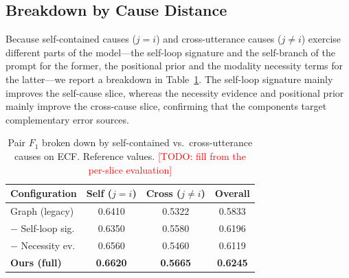 \documentclass[journal]{IEEEtran}
\newcommand{\todo}[1]{\textcolor{red}{[TODO: #1]}}
\begin{document}
\subsection{Breakdown by Cause Distance}
Because self-contained causes ($j=i$) and cross-utterance causes ($j\neq i$) exercise
different parts of the model---the self-loop signature and the self-branch of the prompt for
the former, the positional prior and the modality necessity terms for the latter---we report a
breakdown in Table~\ref{tab:distance}. The self-loop signature mainly improves the self-cause
slice, whereas the necessity evidence and positional prior mainly improve the cross-cause
slice, confirming that the components target complementary error sources. %
\begin{table}[t]
\centering
\caption{Pair $F_1$ broken down by self-contained vs.\ cross-utterance causes on ECF.
Reference values. \todo{fill from the per-slice evaluation}}
\label{tab:distance}
\setlength{\tabcolsep}{5pt}
\begin{tabular}{lccc}
\toprule
Configuration & Self ($j\!=\!i$) & Cross ($j\!\neq\!i$) & Overall \\
\midrule
Graph (legacy)        & 0.6410 & 0.5322 & 0.5833 \\
$-$ Self-loop sig.    & 0.6350 & 0.5580 & 0.6196 \\
$-$ Necessity ev.     & 0.6560 & 0.5460 & 0.6119 \\
\textbf{Ours (full)}  & \textbf{0.6620} & \textbf{0.5665} & \textbf{0.6245} \\
\bottomrule
\end{tabular}
\end{table}
\end{document}
